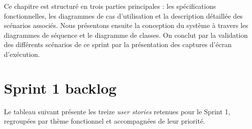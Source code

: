 ﻿\documentclass[a4paper,12pt]{report}
\begin{document}
Ce chapitre est structuré en trois parties principales : les spécifications fonctionnelles, les diagrammes de cas d’utilisation et la description détaillée des scénarios associés. Nous présentons ensuite la conception du système à travers les diagrammes de séquence et le diagramme de classes. On conclut par la validation des différents scénarios de ce sprint par la présentation des captures d’écran d’exécution.
\\

\section{Sprint 1 backlog}


Le tableau suivant présente les treize \textit{user stories}  retenues pour le Sprint 1, regroupées
par thème fonctionnel et accompagnées de leur priorité.
\end{document}

